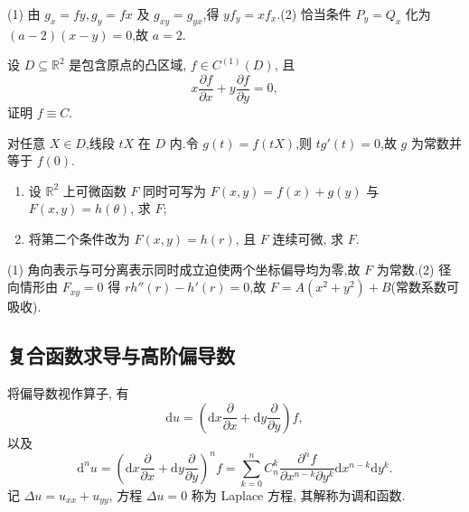 \begin{solution}

    (1) 由 $g_x=fy,g_y=fx$ 及 $g_{xy}=g_{yx}$,得 $y f_y=x f_x$.(2) 恰当条件 $P_y=Q_x$ 化为 $(a-2)(x-y)=0$,故 $a=2$.
\end{solution}

\begin{example}
    设 $D\subseteq\mathbb{R}^2$ 是包含原点的凸区域, $f\in C^{(1)}(D)$, 且
    \[
        x\dfrac{\partial f}{\partial x}+y\dfrac{\partial f}{\partial y}=0,
    \]
    证明 $f\equiv C$.
\end{example}
\exampleblank

\begin{solution}
    对任意 $X\in D$,线段 $tX$ 在 $D$ 内.令 $g(t)=f(tX)$,则 $tg'(t)=0$,故 $g$ 为常数并等于 $f(0)$.
\end{solution}

\begin{example}
    \begin{enumerate}
        \item 设 $\mathbb{R}^2$ 上可微函数 $F$ 同时可写为 $F(x,y)=f(x)+g(y)$ 与 $F(x,y)=h(\theta)$, 求 $F$;
        \item 将第二个条件改为 $F(x,y)=h(r)$, 且 $F$ 连续可微, 求 $F$.
    \end{enumerate}
\end{example}
\exampleblank

\begin{solution}

    (1) 角向表示与可分离表示同时成立迫使两个坐标偏导均为零,故 $F$ 为常数.(2) 径向情形由 $F_{xy}=0$ 得 $rh''(r)-h'(r)=0$,故 $F=A(x^2+y^2)+B$(常数系数可吸收).
\end{solution}



\subsection{复合函数求导与高阶偏导数}

将偏导数视作算子, 有
\[
    \mathrm{d}u=\left(\mathrm{d}x\dfrac{\partial}{\partial x}+\mathrm{d}y\dfrac{\partial}{\partial y}\right)f,
\]
以及
\[
    \mathrm{d}^nu
    =\left(\mathrm{d}x\dfrac{\partial}{\partial x}+\mathrm{d}y\dfrac{\partial}{\partial y}\right)^nf
    =\sum\limits_{k=0}^nC_n^k
    \dfrac{\partial^nf}{\partial x^{n-k}\partial y^k}
    \mathrm{d}x^{n-k}\mathrm{d}y^k.
\]
记 $\Delta u=u_{xx}+u_{yy}$, 方程 $\Delta u=0$ 称为 Laplace 方程, 其解称为调和函数.


